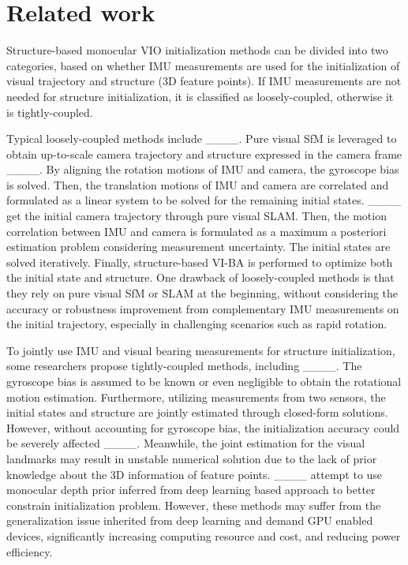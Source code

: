 \section{Related work}
Structure-based monocular VIO initialization methods can be divided into two categories, based on whether IMU measurements are used for the initialization of visual trajectory and structure (3D feature points). If IMU measurements are not needed for structure initialization, it is classified as loosely-coupled, otherwise it is tightly-coupled.

Typical loosely-coupled methods include ____. Pure visual SfM is leveraged to obtain up-to-scale camera trajectory and structure expressed in the camera frame ____. By aligning the rotation motions of IMU and camera, the gyroscope bias is solved. Then, the translation motions of IMU and camera are correlated and formulated as a linear system to be solved for the remaining initial states. ____ get the initial camera trajectory through pure visual SLAM. Then, the motion correlation between IMU and camera is formulated as a maximum a posteriori estimation problem considering measurement uncertainty. The initial states are solved iteratively. Finally, structure-based VI-BA is performed to optimize both the initial state and structure. One drawback of loosely-coupled methods is that they rely on pure visual SfM or SLAM at the beginning, without considering the accuracy or robustness improvement from complementary IMU measurements on the initial trajectory, especially in challenging scenarios such as rapid rotation.

To jointly use IMU and visual bearing measurements for structure initialization, some researchers propose tightly-coupled methods, including ____. The gyroscope bias is assumed to be known or even negligible to obtain the rotational motion estimation. Furthermore, utilizing measurements from two sensors, the initial states and structure are jointly estimated through closed-form solutions. However, without accounting for gyroscope bias, the initialization accuracy could be severely affected ____. Meanwhile, the joint estimation for the visual landmarks may result in unstable numerical solution due to the lack of prior knowledge about the 3D information of feature points. ____ attempt to use monocular depth prior inferred from deep learning based approach to better constrain initialization problem. However, these methods may suffer from the generalization issue inherited from deep learning and demand GPU enabled devices, significantly increasing computing resource and cost, and reducing power efficiency.

